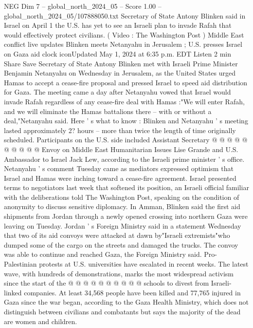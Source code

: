 \begin{textsample}{NEG Dim 7 – global\_north\_2024\_05 – Score 1.00 – global\_north\_2024\_05/107888050.txt}  \label{ex:f7_neg_401}
Secretary of State Antony Blinken said in Israel on April 1 the U.S. has yet to see an Israeli plan to invade Rafah that would effectively protect civilians. ( Video : The Washington Post ) Middle East conflict live updates Blinken meets Netanyahu in Jerusalem ; U.S. presses Israel on Gaza aid clock iconUpdated May 1, 2024 at 6:35 p.m.
EDT Listen 2 min Share Save Secretary of State Antony Blinken met with Israeli Prime Minister Benjamin Netanyahu on Wednesday in Jerusalem, as the United States urged Hamas to accept a cease-fire proposal and pressed Israel to speed aid distribution for Gaza.
The meeting came a day after Netanyahu vowed that Israel would invade Rafah regardless of any cease-fire deal with Hamas :"We will enter Rafah, and we will eliminate the Hamas battalions there -- with or without a deal,"Netanyahu said.
Here ' s what to know : Blinken and Netanyahu ' s meeting lasted approximately 2? hours -- more than twice the length of time originally scheduled.
Participants on the U.S. side included Assistant Secretary @ @ @ @ @ @ @ @ @ @ Envoy on Middle East Humanitarian Issues Lise Grande and U.S.
Ambassador to Israel Jack Lew, according to the Israeli prime minister ' s office.
Netanyahu ' s comment Tuesday came as mediators expressed optimism that Israel and Hamas were inching toward a cease-fire agreement.
Israel presented terms to negotiators last week that softened its position, an Israeli official familiar with the deliberations told The Washington Post, speaking on the condition of anonymity to discuss sensitive diplomacy.
In Amman, Blinken said the first aid shipments from Jordan through a newly opened crossing into northern Gaza were leaving on Tuesday.
Jordan ' s Foreign Ministry said in a statement Wednesday that two of its aid convoys were attacked at dawn by"Israeli extremists"who dumped some of the cargo on the streets and damaged the trucks.
The convoy was able to continue and reached Gaza, the Foreign Ministry said.
Pro-Palestinian protests at U.S. universities have escalated in recent weeks.
The latest wave, with hundreds of demonstrations, marks the most widespread activism since the start of the @ @ @ @ @ @ @ @ @ @ schools to divest from Israeli-linked companies.
At least 34,568 people have been killed and 77,765 injured in Gaza since the war began, according to the Gaza Health Ministry, which does not distinguish between civilians and combatants but says the majority of the dead are women and children.

\end{textsample}
